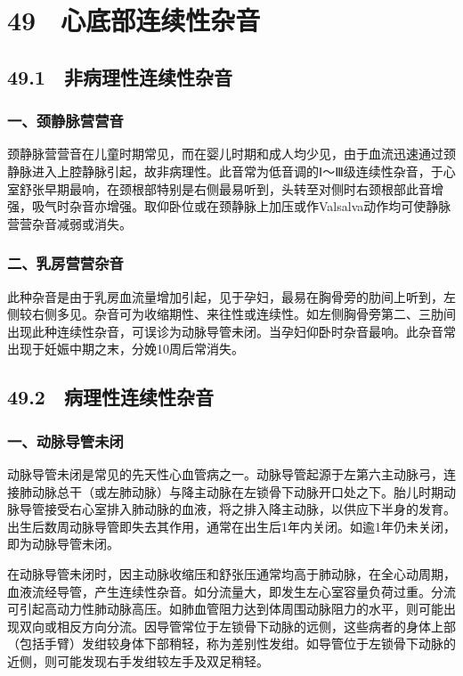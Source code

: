 \protect\hypertarget{text00131.html}{}{}

\section{49　心底部连续性杂音}

\subsection{49.1　非病理性连续性杂音}

\subsubsection{一、颈静脉营营音}

颈静脉营营音在儿童时期常见，而在婴儿时期和成人均少见，由于血流迅速通过颈静脉进入上腔静脉引起，故非病理性。此音常为低音调的Ⅰ～Ⅲ级连续性杂音，于心室舒张早期最响，在颈根部特别是右侧最易听到，头转至对侧时右颈根部此音增强，吸气时杂音亦增强。取仰卧位或在颈静脉上加压或作Valsalva动作均可使静脉营营杂音减弱或消失。

\subsubsection{二、乳房营营杂音}

此种杂音是由于乳房血流量增加引起，见于孕妇，最易在胸骨旁的肋间上听到，左侧较右侧多见。杂音可为收缩期性、来往性或连续性。如左侧胸骨旁第二、三肋间出现此种连续性杂音，可误诊为动脉导管未闭。当孕妇仰卧时杂音最响。此杂音常出现于妊娠中期之末，分娩10周后常消失。

\subsection{49.2　病理性连续性杂音}

\subsubsection{一、动脉导管未闭}

动脉导管未闭是常见的先天性心血管病之一。动脉导管起源于左第六主动脉弓，连接肺动脉总干（或左肺动脉）与降主动脉在左锁骨下动脉开口处之下。胎儿时期动脉导管接受右心室排入肺动脉的血液，将之排入降主动脉，以供应下半身的发育。出生后数周动脉导管即失去其作用，通常在出生后1年内关闭。如逾1年仍未关闭，即为动脉导管未闭。

在动脉导管未闭时，因主动脉收缩压和舒张压通常均高于肺动脉，在全心动周期，血液流经导管，产生连续性杂音。如分流量大，即发生左心室容量负荷过重。分流可引起高动力性肺动脉高压。如肺血管阻力达到体周围动脉阻力的水平，则可能出现双向或相反方向分流。因导管常位于左锁骨下动脉的远侧，这些病者的身体上部（包括手臂）发绀较身体下部稍轻，称为差别性发绀。如导管位于左锁骨下动脉的近侧，则可能发现右手发绀较左手及双足稍轻。


